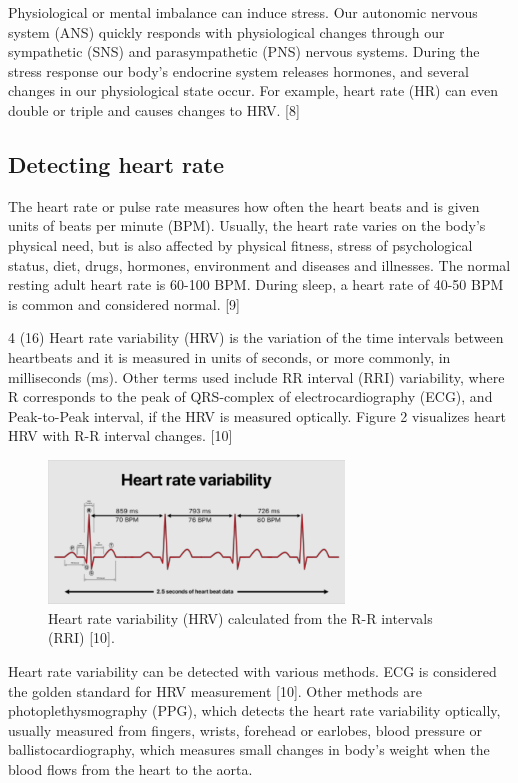 \documentclass{article}
\begin{document}
Physiological or mental imbalance can induce stress. Our autonomic nervous system (ANS)
quickly responds with physiological changes through our sympathetic (SNS) and
parasympathetic (PNS) nervous systems. During the stress response our body’s endocrine
system releases hormones, and several changes in our physiological state occur. For
example, heart rate (HR) can even double or triple and causes changes to HRV. [8]

\subsection{Detecting heart rate}
The heart rate or pulse rate measures how often the heart beats and is given units of beats
per minute (BPM). Usually, the heart rate varies on the body’s physical need, but is also
affected by physical fitness, stress of psychological status, diet, drugs, hormones,
environment and diseases and illnesses. The normal resting adult heart rate is 60-100 BPM.
During sleep, a heart rate of 40-50 BPM is common and considered normal. [9]

4 (16)
Heart rate variability (HRV) is the variation of the time intervals between heartbeats and it is
measured in units of seconds, or more commonly, in milliseconds (ms). Other terms used
include RR interval (RRI) variability, where R corresponds to the peak of QRS-complex of
electrocardiography (ECG), and Peak-to-Peak interval, if the HRV is measured optically.
Figure 2 visualizes heart HRV with R-R interval changes. [10]


\begin{figure}[h]
  \centering
  \includegraphics[width=0.7\textwidth]{heart_rate.png}
  \caption{ Heart rate variability (HRV) calculated from the R-R intervals (RRI) [10].}
  \label{harrin}
\end{figure}


Heart rate variability can be detected with various methods. ECG is considered the golden
standard for HRV measurement [10]. Other methods are photoplethysmography (PPG),
which detects the heart rate variability optically, usually measured from fingers, wrists,
forehead or earlobes, blood pressure or ballistocardiography, which measures small
changes in body’s weight when the blood flows from the heart to the aorta.
\end{document}
